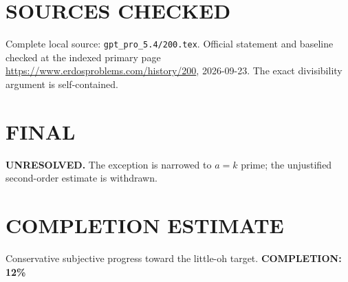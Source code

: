 \section{SOURCES CHECKED}
Complete local source: \texttt{gpt\_pro\_5.4/200.tex}. Official statement and baseline checked at the indexed primary page \url{https://www.erdosproblems.com/history/200}, 2026-09-23. The exact divisibility argument is self-contained.
\section{FINAL}
\textbf{UNRESOLVED.} The exception is narrowed to $a=k$ prime; the unjustified second-order estimate is withdrawn.
\section{COMPLETION ESTIMATE}
Conservative subjective progress toward the little-oh target.
\textbf{COMPLETION: 12\%}
